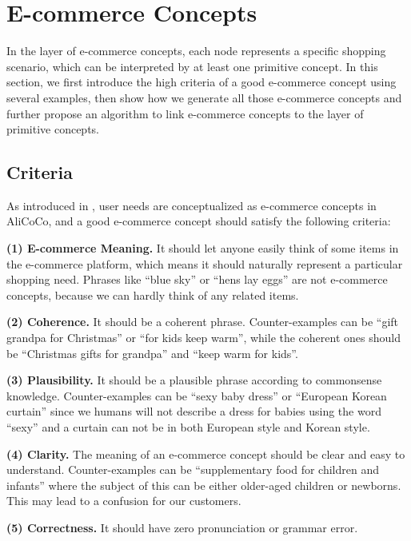 \section{E-commerce Concepts}
\label{sec:ecommerce}

In the layer of e-commerce concepts,
each node represents a specific shopping scenario,
which can be interpreted by at least one primitive concept.
In this section,
we first introduce the high criteria of a good e-commerce concept using several examples, 
then show how we generate all those e-commerce concepts  and further propose an algorithm to link e-commerce concepts to the layer of primitive concepts.



\subsection{Criteria}

As introduced in ,
user needs are conceptualized as e-commerce concepts in AliCoCo, and a good e-commerce concept should satisfy the following criteria:

\noindent
\textbf{(1) E-commerce Meaning.}
It should let anyone easily think of some items in the e-commerce platform, which means it should naturally represent a particular shopping need. Phrases like ``blue sky'' or ``hens lay eggs'' are not e-commerce concepts, 
because we can hardly think of any related items.

\noindent
\textbf{(2) Coherence.}
It should be a coherent phrase. Counter-examples can be 
``gift grandpa for Christmas'' or ``for kids keep warm'',
while the coherent ones should be ``Christmas gifts for grandpa'' and ``keep warm for kids''.

\noindent
\textbf{(3) Plausibility.}
It should be a plausible phrase  according to commonsense knowledge. Counter-examples can be ``sexy baby dress'' or 
``European Korean curtain'' since we humans will not describe a dress for babies using the word ``sexy'' and a curtain can not be in both European style and Korean style.

\noindent
\textbf{(4) Clarity.}
The meaning of an e-commerce concept should be clear and easy to understand.
Counter-examples can be ``supplementary food for children and infants'' where the subject of this can be either older-aged children or newborns. This may lead to a confusion for our customers.

\noindent
\textbf{(5) Correctness.}
It should have zero pronunciation or grammar error.

